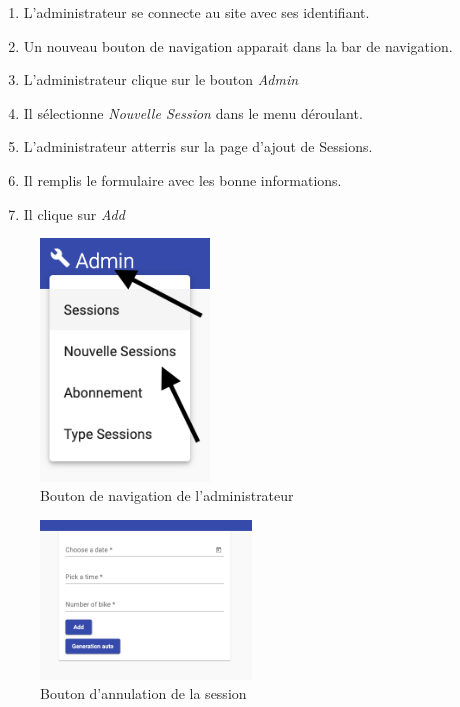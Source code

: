 \begin{enumerate}
	\item L'administrateur se connecte au site avec ses identifiant. 
	\item Un nouveau bouton de navigation apparait dans la bar de navigation. 
	\item L'administrateur clique sur le bouton \textit{Admin}
	\item Il sélectionne \textit{Nouvelle Session} dans le menu déroulant. 
	\item L'administrateur atterris sur la page d'ajout de Sessions. 
	\item Il remplis le formulaire avec les bonne informations.
	\item Il clique sur \textit{Add}
\end{enumerate}

\newpage
\begin{figure}[h]
	\includegraphics[width=0.4\textwidth,center]{Figures/us11-1}
	\caption{Bouton de navigation de l'administrateur}
\end{figure}

\vspace{\baselineskip}
\vspace{\baselineskip}
\begin{figure}[h]
	\includegraphics[width=0.5\textwidth,center]{Figures/us11-2}
	\caption{Bouton d'annulation de la session}
\end{figure}


